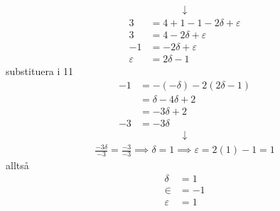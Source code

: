 \documentclass[a4paper,12pt]{article}
\begin{document}
\begin{align}
    \downarrow
\end{align}
\begin{align}
    3 &= 4 + 1 - 1 - 2\delta + \varepsilon \\
    3 &= 4 - 2\delta + \varepsilon \\
    -1 &= -2\delta + \varepsilon \\
    \varepsilon &= 2\delta - 1
\end{align}
substituera i 11
\begin{align}
    -1 &= -(-\delta)-2(2\delta-1) \\
    &= \delta - 4\delta + 2 \\
    &= -3\delta + 2 \\
    -3 &= -3\delta
\end{align}
\begin{align}
    \downarrow
\end{align}
\begin{align}
    \frac{-3\delta}{-3} = \frac{-3}{-3} \implies \delta = 1 \implies \varepsilon = 2(1)-1 = 1
\end{align}
alltså
\begin{align}
    \delta &= 1 \\
    \in &= -1 \\
    \varepsilon &= 1
\end{align}
\end{document}
